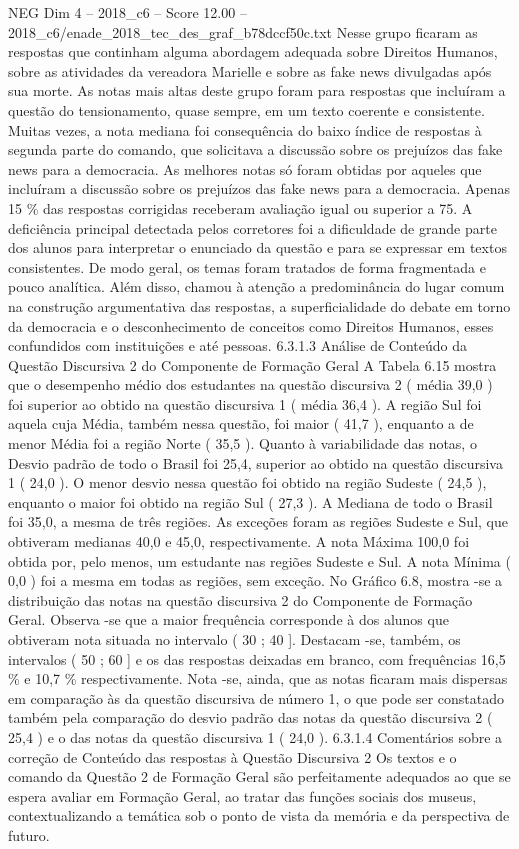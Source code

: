 \begin{textsample}{NEG Dim 4 – 2018\_c6 – Score 12.00 – 2018\_c6/enade\_2018\_tec\_des\_graf\_b78dccf50c.txt}
Nesse grupo ficaram as respostas que continham alguma abordagem adequada sobre Direitos Humanos, sobre as atividades da vereadora Marielle e sobre as fake news divulgadas após sua morte.
As notas mais altas deste grupo foram para respostas que incluíram a questão do tensionamento, quase sempre, em um texto coerente e consistente.
Muitas vezes, a nota mediana foi consequência do baixo índice de respostas à segunda parte do comando, que solicitava a discussão sobre os prejuízos das fake news para a democracia.
As melhores notas só foram obtidas por aqueles que incluíram a discussão sobre os prejuízos das fake news para a democracia.
Apenas 15 \% das respostas corrigidas receberam avaliação igual ou superior a 75.
A deficiência principal detectada pelos corretores foi a dificuldade de grande parte dos alunos para interpretar o enunciado da questão e para se expressar em textos consistentes.
De modo geral, os temas foram tratados de forma fragmentada e pouco analítica.
Além disso, chamou à atenção a predominância do lugar comum na construção argumentativa das respostas, a superficialidade do debate em torno da democracia e o desconhecimento de conceitos como Direitos Humanos, esses confundidos com instituições e até pessoas. 6.3.1.3 Análise de Conteúdo da Questão Discursiva 2 do Componente de Formação Geral A Tabela 6.15 mostra que o desempenho médio dos estudantes na questão discursiva 2 ( média 39,0 ) foi superior ao obtido na questão discursiva 1 ( média 36,4 ).
A região Sul foi aquela cuja Média, também nessa questão, foi maior ( 41,7 ), enquanto a de menor Média foi a região Norte ( 35,5 ).
Quanto à variabilidade das notas, o Desvio padrão de todo o Brasil foi 25,4, superior ao obtido na questão discursiva 1 ( 24,0 ).
O menor desvio nessa questão foi obtido na região Sudeste ( 24,5 ), enquanto o maior foi obtido na região Sul ( 27,3 ).
A Mediana de todo o Brasil foi 35,0, a mesma de três regiões.
As exceções foram as regiões Sudeste e Sul, que obtiveram medianas 40,0 e 45,0, respectivamente.
A nota Máxima 100,0 foi obtida por, pelo menos, um estudante nas regiões Sudeste e Sul.
A nota Mínima ( 0,0 ) foi a mesma em todas as regiões, sem exceção.
No Gráfico 6.8, mostra -se a distribuição das notas na questão discursiva 2 do Componente de Formação Geral.
Observa -se que a maior frequência corresponde à dos alunos que obtiveram nota situada no intervalo ( 30 ; 40 ].
Destacam -se, também, os intervalos ( 50 ; 60 ] e os das respostas deixadas em branco, com frequências 16,5 \% e 10,7 \% respectivamente.
Nota -se, ainda, que as notas ficaram mais dispersas em comparação às da questão discursiva de número 1, o que pode ser constatado também pela comparação do desvio padrão das notas da questão discursiva 2 ( 25,4 ) e o das notas da questão discursiva 1 ( 24,0 ). 6.3.1.4 Comentários sobre a correção de Conteúdo das respostas à Questão Discursiva 2 Os textos e o comando da Questão 2 de Formação Geral são perfeitamente adequados ao que se espera avaliar em Formação Geral, ao tratar das funções sociais dos museus, contextualizando a temática sob o ponto de vista da memória e da perspectiva de futuro.

\end{textsample}
